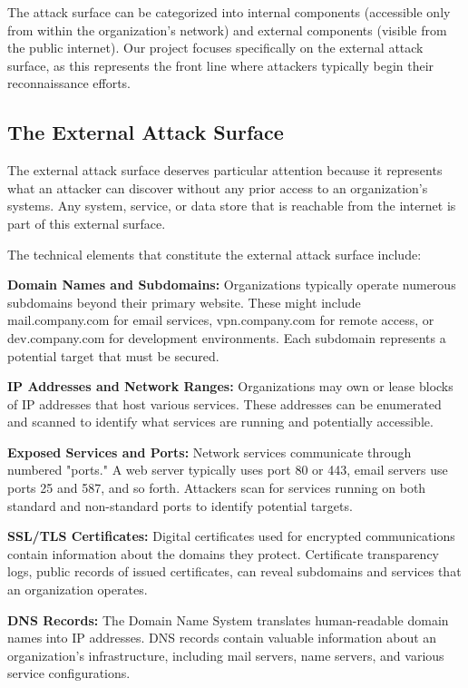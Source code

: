 \documentclass[a4paper,12pt]{report}
\begin{document}
The attack surface can be categorized into internal components (accessible only from within the organization's network) and external components (visible from the public internet). Our project focuses specifically on the external attack surface, as this represents the front line where attackers typically begin their reconnaissance efforts.\hfill \break

\subsection{The External Attack Surface}

The external attack surface deserves particular attention because it represents what an attacker can discover without any prior access to an organization's systems.\cite{proofpoint_attack_surface} Any system, service, or data store that is reachable from the internet is part of this external surface.\hfill \break

The technical elements that constitute the external attack surface include:\hfill \break

\textbf{Domain Names and Subdomains:} Organizations typically operate numerous subdomains beyond their primary website. These might include mail.company.com for email services, vpn.company.com for remote access, or dev.company.com for development environments. Each subdomain represents a potential target that must be secured.\hfill \break

\textbf{IP Addresses and Network Ranges:} Organizations may own or lease blocks of IP addresses that host various services. These addresses can be enumerated and scanned to identify what services are running and potentially accessible.\hfill \break

\textbf{Exposed Services and Ports:} Network services communicate through numbered "ports." A web server typically uses port 80 or 443, email servers use ports 25 and 587, and so forth. Attackers scan for services running on both standard and non-standard ports to identify potential targets.\hfill \break

\textbf{SSL/TLS Certificates:} Digital certificates used for encrypted communications contain information about the domains they protect. Certificate transparency logs, public records of issued certificates, can reveal subdomains and services that an organization operates.\hfill \break

\textbf{DNS Records:} The Domain Name System\cite{rfc1035_dns} translates human-readable domain names into IP addresses. DNS records contain valuable information about an organization's infrastructure, including mail servers, name servers, and various service configurations.\hfill \break
\end{document}
